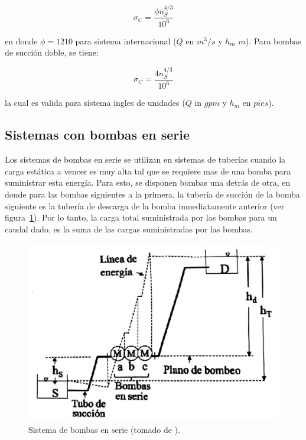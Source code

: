 \documentclass[11pt, oneside]{article}
\begin{document}
\begin{equation}
\sigma_C =  \frac{\phi n_S^{4/3}}{10^6} 
\label{boma24}
\end{equation}

en donde $\phi = 1210$ para sistema internacional ($Q$ en $m^3/s$ y $h_m$ $m$). Para bombas de succi\'on doble, se tiene:

\begin{equation}
\sigma_C =  \frac{4 n_S^{4/3}}{10^6} 
\label{boma25}
\end{equation}

la cual es valida para sistema ingles de unidades ($Q$ in $gpm$ y $h_m$ en $pies$).

\subsection{Sistemas con bombas en serie}
Los sistemas de bombas en serie se utilizan en sistemas de tuber\'ias cuando la carga est\'atica a vencer es muy alta tal que se requiere mas de una bomba para suministrar esta energ\'ia. Para esto, se disponen bombas una detr\'as de otra, en donde para las bombas siguientes a la primera, la tuber\'ia de succi\'on de la bomba siguiente es la tuber\'ia de descarga de la bomba inmediatamente anterior (ver figura~\ref{bom22}). Por lo tanto, la carga total suministrada por las bombas para un caudal dado, es la suma de las cargas suministradas por las bombas.

\begin{figure}[h]
\centering
\includegraphics[width=12cm]{./figs/bom22.jpeg}
\caption{Sistema de bombas en serie (tomado de \cite{agudelo2011mecanica}).} 
\label{bom22}
\end{figure}
\end{document}
